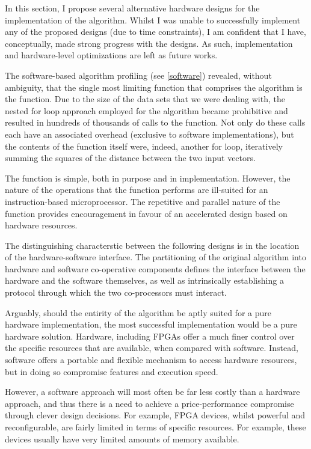 In this section, I propose several alternative hardware designs for the
implementation of the  algorithm.
Whilst I was unable to successfully implement any of the proposed designs (due
to time constraints), I am confident that I have, conceptually, made strong
progress with the designs. As such, implementation and hardware-level
optimizations are left as future works.

The software-based algorithm profiling (see \autoref{software}) revealed,
without ambiguity, that the single most limiting function that comprises the
 algorithm is the
 function. Due to the size of the data sets that we
were dealing with, the nested for loop approach employed for the algorithm
became prohibitive and resulted in hundreds of thousands of calls to the
 function. Not only do these calls each have an
associated overhead (exclusive to software implementations), but the contents of
the function itself were, indeed, another for loop, iteratively summing the
squares of the distance between the two input vectors.

The  function is simple, both in purpose and in
implementation. However, the nature of the operations that the function
performs are ill-suited for an instruction-based microprocessor. The repetitive
and parallel nature of the function provides encouragement in favour of an
accelerated design based on hardware resources.

The distinguishing characterstic between the following designs is in the
location of the hardware-software interface. The partitioning of the original
algorithm into hardware and software co-operative components defines the
interface between the hardware and the software themselves, as well as
intrinsically establishing a protocol through which the two co-processors must
interact.

Arguably, should the entirity of the algorithm be aptly suited for a pure
hardware implementation, the most successful implementation would be a pure
hardware solution. Hardware, including \glspl{FPGA} offer a much finer control
over the specific resources that are available, when compared with software.
Instead, software offers a portable and flexible mechanism to access hardware
resources, but in doing so compromise features and execution speed.

However, a software approach will most often be far less costly than a hardware
approach, and thus there is a need to achieve a price-performance compromise
through clever design decisions. For example, \gls{FPGA} devices, whilst
powerful and reconfigurable, are fairly limited in terms of specific resources.
For example, these devices usually have very limited amounts of memory
available.

